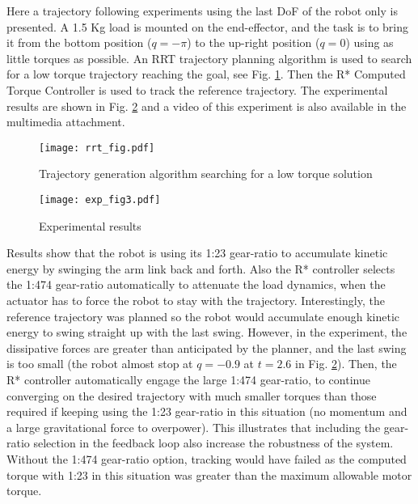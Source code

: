Here a trajectory following experiments using the last DoF of the robot only is presented. A 1.5 Kg load is mounted on the end-effector, and the task is to bring it from the bottom position ($q=-\pi$) to the up-right position ($q=0$) using as little torques as possible. An RRT trajectory planning algorithm is used to search for a low torque trajectory reaching the goal, see Fig. \ref{fig:exp_rrt}. Then the R* Computed Torque Controller is used to track the reference trajectory. The experimental results are shown in Fig. \ref{fig:exp_traj} and a video of this experiment is also available in the multimedia attachment. 
%
\begin{figure}[htp]
	\centering
		\texttt{[image: rrt\_fig.pdf]}
	\caption{Trajectory generation algorithm searching for a low torque solution}
	\label{fig:exp_rrt}
\end{figure}
%
\begin{figure}[htp]
	\centering
		\texttt{[image: exp\_fig3.pdf]}
	\caption{Experimental results}
	\label{fig:exp_traj}
	\vspace{-10pt}
\end{figure}
%
Results show that the robot is using its 1:23 gear-ratio to accumulate kinetic energy by swinging the arm link back and forth. Also the R* controller selects the 1:474 gear-ratio automatically to attenuate the load dynamics, when the actuator has to force the robot to stay with the trajectory.  Interestingly, the reference trajectory was planned so the robot would accumulate enough kinetic energy to swing straight up with the last swing. However, in the experiment, the dissipative forces are greater than anticipated by the planner, and the last swing is too small (the robot almost stop at $q=-0.9$ at $t=2.6$ in Fig. \ref{fig:exp_traj}). Then, the R* controller automatically engage the large 1:474 gear-ratio, to continue converging on the desired trajectory with much smaller torques than those required if keeping using the 1:23 gear-ratio in this situation (no momentum and a large gravitational force to overpower). This illustrates that including the gear-ratio selection in the feedback loop also increase the robustness of the system. Without the 1:474 gear-ratio option, tracking would have failed as the computed torque with 1:23 in this situation was greater than the maximum allowable motor torque.


